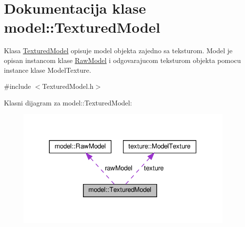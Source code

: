 \hypertarget{classmodel_1_1TexturedModel}{}\section{Dokumentacija klase model\+:\+:Textured\+Model}
\label{classmodel_1_1TexturedModel}


Klasa \hyperlink{classmodel_1_1TexturedModel}{Textured\+Model} opisuje model objekta zajedno sa teksturom. Model je opisan instancom klase \hyperlink{classmodel_1_1RawModel}{Raw\+Model} i odgovarajucom teksturom objekta pomocu instance klase Model\+Texture.  




{\ttfamily \#include $<$Textured\+Model.\+h$>$}



Klasni dijagram za model\+:\+:Textured\+Model\+:\nopagebreak
\begin{figure}[H]
\begin{center}
\leavevmode
\includegraphics[width=306pt]{classmodel_1_1TexturedModel__coll__graph}
\end{center}
\end{figure}
